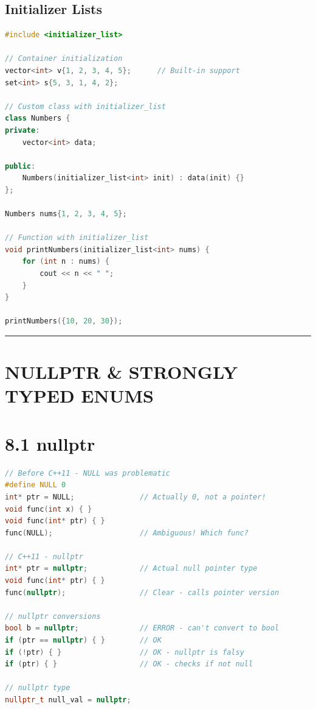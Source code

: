 \hypertarget{initializer-lists}{%
\subsection{Initializer Lists}\label{initializer-lists}}

\begin{lstlisting}[language={C++}]
#include <initializer_list>

// Container initialization
vector<int> v{1, 2, 3, 4, 5};      // Built-in support
set<int> s{5, 3, 1, 4, 2};

// Custom class with initializer_list
class Numbers {
private:
    vector<int> data;

public:
    Numbers(initializer_list<int> init) : data(init) {}
};

Numbers nums{1, 2, 3, 4, 5};

// Function with initializer_list
void printNumbers(initializer_list<int> nums) {
    for (int n : nums) {
        cout << n << " ";
    }
}

printNumbers({10, 20, 30});
\end{lstlisting}

\begin{center}\rule{0.5\linewidth}{0.5pt}\end{center}

\hypertarget{nullptr-strongly-typed-enums}{%
\section{NULLPTR \& STRONGLY TYPED
ENUMS}\label{nullptr-strongly-typed-enums}}

\hypertarget{nullptr}{%
\section{8.1 nullptr}\label{nullptr}}

\begin{lstlisting}[language={C++}]
// Before C++11 - NULL was problematic
#define NULL 0
int* ptr = NULL;               // Actually 0, not a pointer!
void func(int x) { }
void func(int* ptr) { }
func(NULL);                    // Ambiguous! Which func?

// C++11 - nullptr
int* ptr = nullptr;            // Actual null pointer type
void func(int* ptr) { }
func(nullptr);                 // Clear - calls pointer version

// nullptr conversions
bool b = nullptr;              // ERROR - can't convert to bool
if (ptr == nullptr) { }        // OK
if (!ptr) { }                  // OK - nullptr is falsy
if (ptr) { }                   // OK - checks if not null

// nullptr type
nullptr_t null_val = nullptr;
\end{lstlisting}

